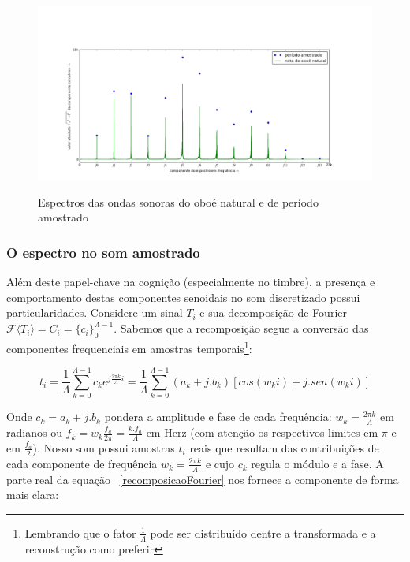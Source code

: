 \begin{figure}[h!]
    \centering
    \caption{Espectros das ondas sonoras do oboé natural e de período amostrado}
        \includegraphics[width=\textwidth]{figuras/espectroOboeAmostradoNatural2}
        \label{fig:espectroOboe}
\end{figure}





\subsubsection{O espectro no som amostrado}
Além deste papel-chave na cognição (especialmente no timbre), a presença e comportamento destas componentes senoidais 
no som discretizado possui particularidades. Considere um sinal $T_i$ e sua decomposição de Fourier $\mathcal{F}\langle T_i\rangle=C_i=\{c_i\}_0^{\Lambda-1}$. Sabemos que a recomposição segue a conversão das componentes frequenciais em amostras temporais\footnote{Lembrando que o fator $\frac{1}{\Lambda}$ pode ser distribuído dentre a transformada e a reconstrução como preferir}:

 
\begin{equation}\label{recomposicaoFourier}
t_i = \frac{1}{\Lambda}\sum_{k=0}^{\Lambda-1}c_ke^{j \frac{2\pi k}{\Lambda} i } = \frac{1}{\Lambda}\sum_{k=0}^{\Lambda-1}(a_k+ j . b_k)\left[cos(w_k i) +j . sen(w_k i)\right]
\end{equation}

Onde $c_k = a_k + j . b_k$ pondera a amplitude e fase de cada frequência: $w_k=\frac{2\pi k}{\Lambda}$ em radianos ou $f_k=w_k\frac{f_a}{2\pi}=\frac{k.f_a}{\Lambda}$ em Herz (com atenção os respectivos limites em $\pi$ e em $\frac{f_a}{2}$). Nosso som possui amostras $t_i$ reais que resultam das contribuições de cada componente de frequência $w_k=\frac{2\pi k}{\Lambda}$ e cujo $c_k$ regula o módulo e a fase. A parte real da equação ~\ref{recomposicaoFourier} nos fornece a componente de forma mais clara:


